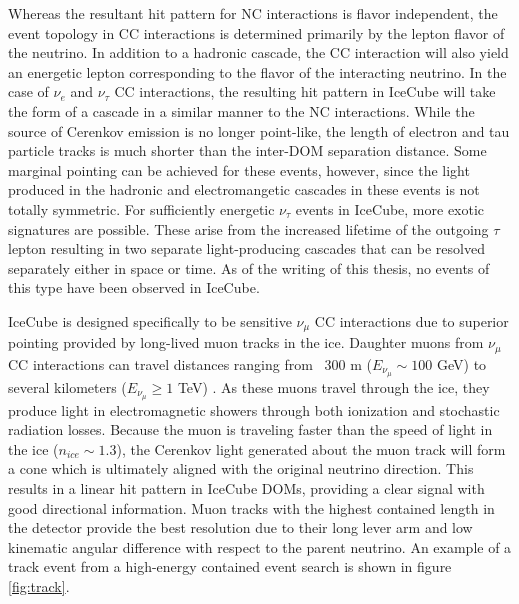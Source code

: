 \documentclass{gatech-thesis}
\begin{document}
Whereas the resultant hit pattern for NC interactions is flavor independent, the event topology in CC interactions is determined primarily by the lepton flavor of the neutrino. In addition to a hadronic cascade, the CC interaction will also yield an energetic lepton corresponding to the flavor of the interacting neutrino. In the case of $\nu_{e}$ and $\nu_{\tau}$ CC interactions, the resulting hit pattern in IceCube will take the form of a cascade in a similar manner to the NC interactions. While the source of Cerenkov emission is no longer point-like, the length of electron and tau particle tracks is much shorter than the inter-DOM separation distance. Some marginal pointing can be achieved for these events, however, since the light produced in the hadronic and electromangetic cascades in these events is not totally symmetric. For sufficiently energetic $\nu_{\tau}$ events in IceCube, more exotic signatures are possible. These arise from the increased lifetime of the outgoing $\tau$ lepton resulting in two separate light-producing cascades that can be resolved separately either in space or time. As of the writing of this thesis, no events of this type have been observed in IceCube.

IceCube is designed specifically to be sensitive $\nu_{\mu}$ CC interactions due to superior pointing provided by long-lived muon tracks in the ice. Daughter muons from $\nu_{\mu}$ CC interactions can travel distances ranging from ~300 m ($E_{\nu_{\mu}}\sim 100$ GeV) to several kilometers ($E_{\nu_{\mu}}\geq 1$ TeV) \cite{2001PhRvD..63i4020I}. As these muons travel through the ice, they produce light in electromagnetic showers through both ionization and stochastic radiation losses. Because the muon is traveling faster than the speed of light in the ice ($n_{ice} \sim 1.3$), the Cerenkov light generated about the muon track will form a cone which is ultimately aligned with the original neutrino direction. This results in a linear hit pattern in IceCube DOMs, providing a clear signal with good directional information. Muon tracks with the highest contained length in the detector provide the best resolution due to their long lever arm and low kinematic angular difference with respect to the parent neutrino. An example of a track event from a high-energy contained event search is shown in figure \ref{fig:track}.
\end{document}
